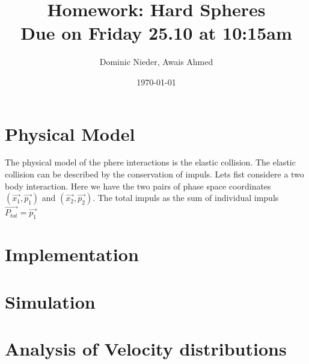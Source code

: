 \documentclass{article}
\title{
    \vspace{2in}
    \textmd{\textbf{Homework: Hard Spheres}}\\
    \normalsize\vspace{0.1in}\small{Due on Friday 25.10 at 10:15am}\\
    \vspace{0.1in}
    \vspace{3in}
}
\author{Dominic Nieder, Awais Ahmed}
\date{\today}
\begin{document}
\maketitle

\newpage

\section{Physical Model}
    The physical model of the phere interactions is the elastic collision. 
    The elastic collision can be described by the conservation of impuls. Lets fist considere
    a two body interaction. Here we have the two pairs of phase space coordinates 
    $(\vec{x_1}, \vec{p_1})$ and $(\vec{x_2}, \vec{p_2})$. The total impuls as the sum of
    individual impuls
    $\vec{P_{tot}}=\vec{p_1}$

\section{Implementation}
    

\section{Simulation}


\section{Analysis of Velocity distributions}
\end{document}
